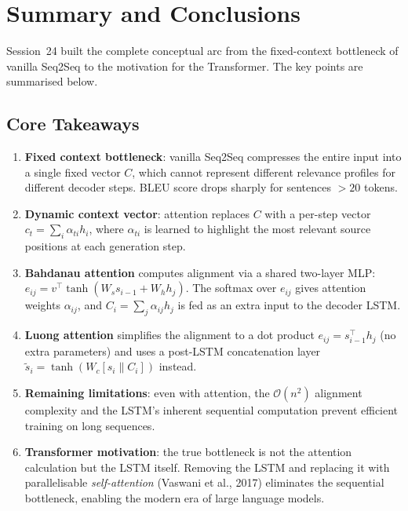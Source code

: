 \documentclass[12pt,a4paper]{article}
\begin{document}
\section{Summary and Conclusions}
\label{sec:summary}

Session~24 built the complete conceptual arc from the fixed-context
bottleneck of vanilla Seq2Seq to the motivation for the Transformer.
The key points are summarised below.

\subsection*{Core Takeaways}

\begin{enumerate}[label=\textbf{\arabic*.}]
  \item \textbf{Fixed context bottleneck}: vanilla Seq2Seq compresses
        the entire input into a single fixed vector $C$, which cannot
        represent different relevance profiles for different decoder
        steps.  BLEU score drops sharply for sentences $> 20$ tokens.

  \item \textbf{Dynamic context vector}: attention replaces $C$ with
        a per-step vector $c_t = \sum_i \alpha_{ti} h_i$, where
        $\alpha_{ti}$ is learned to highlight the most relevant source
        positions at each generation step.

  \item \textbf{Bahdanau attention} computes alignment via a shared
        two-layer MLP:
        $e_{ij} = v^{\top}\tanh(W_s s_{i-1} + W_h h_j)$.
        The softmax over $e_{ij}$ gives attention weights $\alpha_{ij}$,
        and $C_i = \sum_j \alpha_{ij} h_j$ is fed as an extra input
        to the decoder LSTM.

  \item \textbf{Luong attention} simplifies the alignment to a dot
        product $e_{ij} = s_{i-1}^{\top} h_j$ (no extra parameters)
        and uses a post-LSTM concatenation layer
        $\tilde{s}_i = \tanh(W_c [s_i \| C_i])$ instead.

  \item \textbf{Remaining limitations}: even with attention, the
        $\mathcal{O}(n^2)$ alignment complexity and the LSTM's
        inherent sequential computation prevent efficient training on
        long sequences.

  \item \textbf{Transformer motivation}: the true bottleneck is not
        the attention calculation but the LSTM itself.  Removing the
        LSTM and replacing it with parallelisable \emph{self-attention}
        (Vaswani et al., 2017) eliminates the sequential bottleneck,
        enabling the modern era of large language models.
\end{enumerate}
\end{document}
